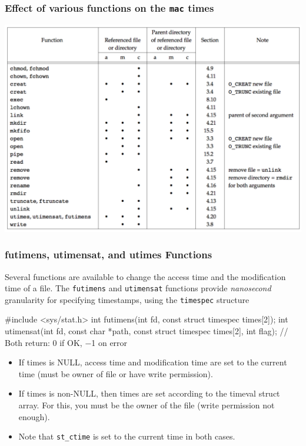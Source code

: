 \documentclass[newPxFont,sthlmFooter,nooffset]{beamer}
\begin{document}
\begin{frame}[t]
  \frametitle{Effect of various functions on the \texttt{mac} times}
\centering
\includegraphics[height=0.90\textheight]{figure/fig4_20_effect.png}
\end{frame}



\begin{frame}[containsverbatim,t]
  \frametitle{futimens, utimensat, and utimes Functions}
Several functions are available to change the access time and the modification time of a file. The \texttt{futimens} and \texttt{utimensat} functions provide \textit{nanosecond} granularity for specifying timestamps, using the \texttt{timespec} structure
\bigskip

\begin{codedef}
#include <sys/stat.h>
int futimens(int fd, const struct timespec times[2]);
int utimensat(int fd, const char *path, const struct timespec times[2], int flag);
// Both return: 0 if OK, −1 on error  
\end{codedef}
{\footnotesize
\begin{itemize}
\item If times is NULL, access time and modification time are set to
  the current time (must be owner of file or have write permission).
\item If times is non-NULL, then times are set according to the timeval
  struct array. For this, you must be the owner of the file (write
  permission not enough).  \bigskip
\item Note that \texttt{st\_ctime} is set to the current time in both
  cases.  \bigskip
\end{itemize}
}
\end{frame}
\end{document}
